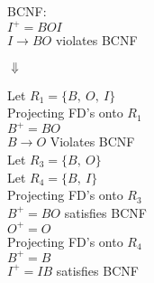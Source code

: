 \documentclass[12pt]{article}
\begin{document}
\newpage

BCNF:\\
$I^+ = BOI$\\
$I \rightarrow BO$ violates BCNF
\begin{center}
    $\Downarrow$
\end{center}
\begin{minipage}[t]{0.5\textwidth} %
    Let $R_1 = \{B,\ O,\ I\}$\\

    Projecting FD's onto $R_1$\\
    $B^+ = BO$ \\
    $B \rightarrow O$ Violates BCNF\\


    Let $R_3 = \{B,\ O\}$\\
    Let $R_4 = \{B,\ I\}$\\

    Projecting FD's onto $R_3$\\
    $B^+ = BO$ satisfies BCNF\\
    $O^+ = O$\\

    Projecting FD's onto $R_4$\\
    $B^+ = B$ \\
    $I^+ = IB$ satisfies BCNF\\

\end{minipage}
\end{document}
